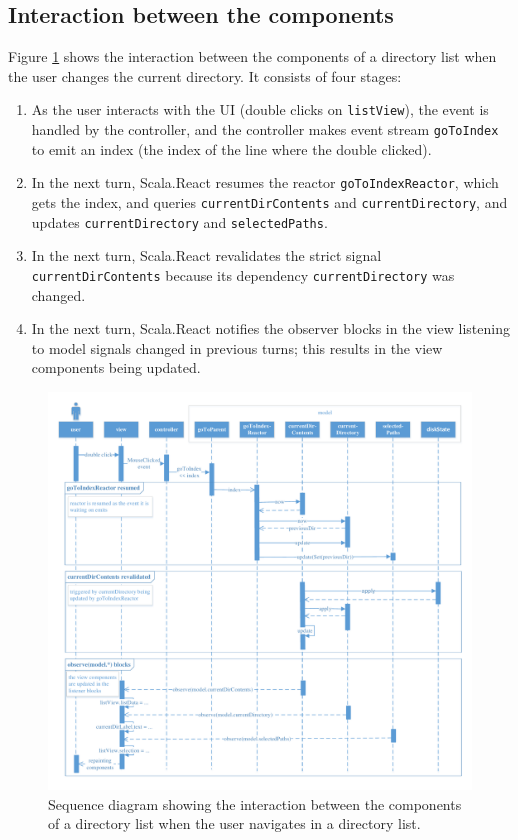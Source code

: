 \subsection{Interaction between the components}

Figure \ref{fig:scomm_event_propagation} shows the interaction between the components of a directory list when the user changes the current directory. It consists of four stages:
\begin{enumerate}
\item As the user interacts with the UI (double clicks on \texttt{listView}), the event is handled by the controller, and the controller makes event stream \texttt{goToIndex} to emit an index (the index of the line where the double clicked).
\item In the next turn, Scala.React resumes the reactor \texttt{goToIndexReactor}, which gets the index, and queries \texttt{currentDirContents} and \texttt{currentDirectory}, and updates \texttt{currentDirectory} and \texttt{selectedPaths}.
\item In the next turn, Scala.React revalidates the strict signal \texttt{currentDirContents} because its dependency \texttt{currentDirectory} was changed.
\item In the next turn, Scala.React notifies the observer blocks in the view listening to model signals   changed in previous turns; this results in the view components being updated.
\end{enumerate}

\begin{figure}[h!]
\centering
  \includegraphics[width=1\textwidth]{images/scomm-event-propagation.pdf}
\caption{Sequence diagram showing the interaction between the components of a directory list when the user navigates in a directory list.}
\label{fig:scomm_event_propagation}
\end{figure}


